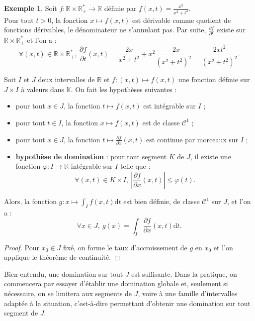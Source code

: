 \documentclass[french]{article}
\newcommand{\R}{\mathbb{R}}
\newcommand{\K}{\mathbb{K}}
\newcommand{\st}{^*}
\renewcommand{\d}{\text{d}}
\theoremstyle{plain}
\theoremstyle{definition}
\newtheorem*{ex}{Exemple}
\theoremstyle{remark}
\begin{document}
\begin{ex}
	Soit $f:\R\times\R_+\st\to\R$ définie par $f(x,t)=\displaystyle\frac{x^2}{x^2+t^2}$.\\
	Pour tout $t>0$, la fonction $x\mapsto f(x,t)$ est dérivable comme quotient de fonctions dérivables, le dénominateur ne s'annulant pas. Par suite, $\displaystyle\frac{\partial f}{\partial t}$ existe sur $\R\times\R_+\st$ et l'on a :
	$$\forall (x,t)\in\R\times\R_+\st,\ \frac{\partial f}{\partial t}(x,t)=\frac{2x}{x^2+t^2}+x^2\frac{-2x}{(x^2+t^2)^2}=\frac{2xt^2}{(x^2+t^2)^2}.$$
\end{ex}

\begin{thm}
	Soit $I$ et $J$ deux intervalles de $\R$ et $f:(x,t)\mapsto f(x,t)$ une fonction définie sur $J\times I$ à valeurs dans $\K$. On fait les hypothèses suivantes :
	\begin{itemize}
		\item pour tout $x\in J$, la fonction $t\mapsto f(x,t)$ est intégrable sur $I$ ;
		\item pour tout $t\in I$, la fonction $x\mapsto f(x,t)$ est de classe $\mathcal{C}^1$ ;
		\item pour tout $x\in J$, la fonction $t\mapsto\displaystyle\frac{\partial f}{\partial x}(x,t)$ est continue par morceaux sur $I$ ;
		\item \textbf{hypothèse de domination} : pour tout segment $K$ de $J$, il existe une fonction $\varphi:I\to\R$ intégrable sur $I$ telle que :
		$$\forall (x,t)\in K\times I,\ \left\lvert\frac{\partial f}{\partial x}(x,t)\right\rvert\leqslant\varphi(t).$$
	\end{itemize}
	Alors, la fonction $g:x\mapsto\displaystyle\int_I f(x,t)\d t$ est bien définie, de classe $\mathcal{C}^1$ sur $J$, et l'on a :
	$$\forall x\in J,\ g(x)=\int_I\frac{\partial f}{\partial x}(x,t)\d t.$$
\end{thm}
\begin{proof}
	Pour $x_0\in J$ fixé, on forme le taux d'accroissement de $g$ en $x_0$ et l'on applique le théorème de continuité.
\end{proof}

\begin{met}
	Bien entendu, une domination sur tout $J$ est suffisante. Dans la pratique, on commencera par essayer d'établir une domination globale et, seulement si nécessaire, on se limitera aux segments de $J$, voire à une famille d'intervalles adaptée à la situation, c'est-à-dire permettant d'obtenir une domination sur tout segment de $J$.
\end{met}
\end{document}
